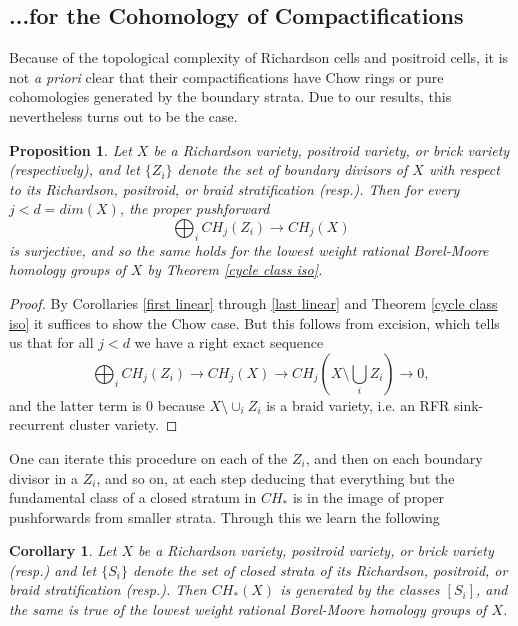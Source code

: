 \documentclass[11pt]{amsart}
\newtheorem{cor}[thm]{Corollary}
\newtheorem{prop}[thm]{Proposition}
\theoremstyle{definition}
\theoremstyle{remark}
\numberwithin{equation}{section}
\begin{document}
\subsection{...for the Cohomology of Compactifications}\label{subsection 6.2}

Because of the topological complexity of Richardson cells and positroid cells, it is not \textit{a priori} clear that their compactifications have Chow rings or pure cohomologies generated by the boundary strata. Due to our results, this nevertheless turns out to be the case.

\begin{prop}
    Let $X$ be a Richardson variety, positroid variety, or brick variety (respectively), and let $\{Z_i\}$ denote the set of boundary divisors of $X$ with respect to its Richardson, positroid, or braid stratification (resp.). Then for every $j < d = dim(X)$, the proper pushforward $$\bigoplus_i CH_j(Z_i) \rightarrow CH_j(X)$$ is surjective, and so the same holds for the lowest weight rational Borel-Moore homology groups of $X$ by Theorem \ref{cycle class iso}.
\end{prop}

\begin{proof}
    By Corollaries \ref{first linear} through \ref{last linear} and Theorem \ref{cycle class iso} it suffices to show the Chow case. But this follows from excision, which tells us that for all $j < d$ we have a right exact sequence \begin{equation}
        \bigoplus_i CH_j(Z_i) \rightarrow CH_j(X) \rightarrow CH_j(X \setminus \bigcup_i Z_i) \rightarrow 0,
    \end{equation} and the latter term is $0$ because $X \setminus \cup_i Z_i$ is a braid variety, i.e. an RFR sink-recurrent cluster variety.
\end{proof}

One can iterate this procedure on each of the $Z_i$, and then on each boundary divisor in a $Z_i$, and so on, at each step deducing that everything but the fundamental class of a closed stratum in $CH_*$ is in the image of proper pushforwards from smaller strata. Through this we learn the following

\begin{cor}\label{generation}
    Let $X$ be a Richardson variety, positroid variety, or brick variety (resp.) and let $\{S_i\}$ denote the set of closed strata of its Richardson, positroid, or braid stratification (resp.). Then $CH_*(X)$ is generated by the classes $[S_i]$, and the same is true of the lowest weight rational Borel-Moore homology groups of $X$.
\end{cor}
\end{document}
